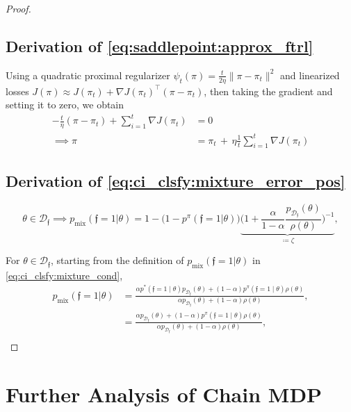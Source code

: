 \documentclass{article} %
\newcommand{\feas}{\mathfrak{f}}
\newcommand{\MeasuredCISet}{\mathcal{D}_{\feas{}}}
\newcommand{\pmix}{p_{\text{mix}}}
\begin{document}
\begin{proof}
\subsection{Derivation of \eqref{eq:saddlepoint:approx_ftrl}} \label{app:proof:saddlepoint:approx_ftrl}

Using a quadratic proximal regularizer
$\psi_t(\pi) = \frac{t}{2 \eta} \| \pi - \pi_t \|^2$ and linearized losses $J(\pi) \approx J(\pi_t) + \nabla J(\pi_t)^\top (\pi - \pi_t)$, then taking the gradient and setting it to zero, we obtain
\begin{align}
    -\frac{t}{\eta} ( \pi - \pi_t ) + \sum_{i=1}^{t} \nabla J(\pi_t) &= 0\\
    \implies \pi &= \pi_t \,+\, \eta \frac{1}{t} \sum_{i=1}^{t} \nabla J(\pi_t)
\end{align}


\subsection{Derivation of \eqref{eq:ci_clsfy:mixture_error_pos}} \label{app:proof:mixture_error_pos}
\begin{equation}
\theta \in \MeasuredCISet \implies \pmix{}(\feas{} = 1 | \theta)
= 1 - \Big( 1 - p^\pi(\feas{} = 1 | \theta) \Big) \underbrace{ \Big(1 + \frac{\alpha}{1 - \alpha} \frac{ p_{\MeasuredCISet}(\theta)}{\rho(\theta)} \Big)^{-1} }_{\coloneqq \zeta },
\end{equation}

For $\theta \in \MeasuredCISet$, starting from the definition of $\pmix{}(\feas{} = 1 | \theta)$ in \eqref{eq:ci_clsfy:mixture_cond},
\begin{align}
    \pmix{}(\feas{} = 1 | \theta)
    &= \frac{\alpha p^*(\feas{} = 1 \mid \theta) p_{\MeasuredCISet}(\theta) + (1-\alpha) p^\pi(\feas{}=1 \mid \theta) \rho(\theta) }
    { \alpha p_{\MeasuredCISet}(\theta) + (1-\alpha) \rho(\theta) }, \\
    &= \frac{\alpha p_{\MeasuredCISet}(\theta) + (1-\alpha) p^\pi(\feas{}=1 \mid \theta) \rho(\theta) }
    { \alpha p_{\MeasuredCISet}(\theta) + (1-\alpha) \rho(\theta) }, \\
\end{align}

\end{proof}


\FloatBarrier
\newpage
\section{Further Analysis of Chain MDP} \label{app:chain_example}
\end{document}
